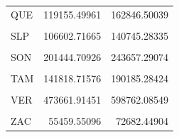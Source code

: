 \documentclass[
]{article}
\newenvironment{Shaded}{\begin{snugshade}}{\end{snugshade}}
\newcommand{\DataTypeTok}[1]{\textcolor[rgb]{0.13,0.29,0.53}{#1}}
\newcommand{\DecValTok}[1]{\textcolor[rgb]{0.00,0.00,0.81}{#1}}
\newcommand{\KeywordTok}[1]{\textcolor[rgb]{0.13,0.29,0.53}{\textbf{#1}}}
\newcommand{\NormalTok}[1]{#1}
\newcommand{\OperatorTok}[1]{\textcolor[rgb]{0.81,0.36,0.00}{\textbf{#1}}}
\newcommand{\StringTok}[1]{\textcolor[rgb]{0.31,0.60,0.02}{#1}}
\begin{document}
\begin{table}[H]
\begin{tabular}[t]{lrr}
QUE & 119155.49961 & 162846.50039\\
\cellcolor{gray!6}{ROO} & \cellcolor{gray!6}{119931.37955} & \cellcolor{gray!6}{156322.62045}\\
SLP & 106602.71665 & 140745.28335\\
\cellcolor{gray!6}{SIN} & \cellcolor{gray!6}{204642.02632} & \cellcolor{gray!6}{240783.97368}\\
\addlinespace
SON & 201444.70926 & 243657.29074\\
\cellcolor{gray!6}{TAB} & \cellcolor{gray!6}{167271.93927} & \cellcolor{gray!6}{217834.06073}\\
TAM & 141818.71576 & 190185.28424\\
\cellcolor{gray!6}{TLA} & \cellcolor{gray!6}{83941.09452} & \cellcolor{gray!6}{104370.90548}\\
VER & 473661.91451 & 598762.08549\\
\addlinespace
\cellcolor{gray!6}{YUC} & \cellcolor{gray!6}{143952.52066} & \cellcolor{gray!6}{180483.47934}\\
ZAC & 55459.55096 & 72682.44904\\
\bottomrule
\end{tabular}
\end{table}

\begin{Shaded}
\end{Shaded}
\end{document}
